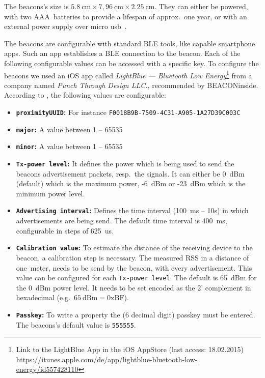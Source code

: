 The beacons's size is $5.8~\text{cm} \times 7,96~\text{cm} \times 2.25~\text{cm}$. They can either be powered, with two AAA~batteries to provide a lifespan of approx.\ one year, or with an external power supply over micro usb~\citep{binside:ds}.

The beacons are configurable with standard \ac{BLE} tools, like capable smartphone apps. Such an app establishes a \ac{BLE} connection to the beacon. Each of the following configurable values can be accessed with a specific key. To configure the beacons we used an iOS app called \emph{LightBlue --- Bluetooth Low Energy}\footnote{Link to the LightBlue App in the iOS AppStore (last access: 18.02.2015) \url{https://itunes.apple.com/de/app/lightblue-bluetooth-low-energy/id557428110}} from a company named \emph{Punch Through Design LLC.}, recommended by BEACONinside. According to \citet{binside:ds}, the following values are configurable:
\begin{itemize}
  \item \textbf{\texttt{proximityUUID}:} For instance \texttt{F0018B9B-7509-4C31-A905-1A27D39C003C}
  \item \textbf{\texttt{major}:} A value between 1 -- 65535
  \item \textbf{\texttt{minor}:} A value between 1 -- 65535
  \item \textbf{\texttt{Tx-power level}:} It defines the power which is being used to send the beacons advertisement packets, resp.\ the signals. It can either be 0~dBm (default) which is the maximum power, -6~dBm or -23~dBm which is the minimum power level.
  \item \textbf{\texttt{Advertising interval}:} Defines the time interval (100~ms -- 10s) in which advertisements are being send. The default time interval is 400~ms, configurable in steps of 625~us.
  \item \textbf{\texttt{Calibration value}:} To estimate the distance of the receiving device to the beacon, a calibration step is necessary. The measured \acs{RSS} in a distance of one~meter, needs to be send by the beacon, with every advertisement. This value can be configured for each \texttt{Tx-power level}. The default is 65~dBm for the 0~dBm power level. It needs to be set encoded as the 2' complement in hexadecimal (e.g.\ $65~\text{dBm} = \text{0xBF}$).
  \item \textbf{\texttt{Passkey}:} To write a property the (6 decimal digit) passkey must be entered. The beacons's default value is \texttt{555555}.
\end{itemize}

